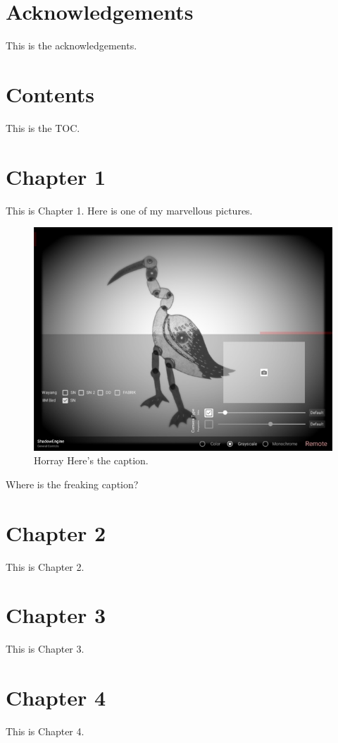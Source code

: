 \hypertarget{acknowledgements}{%
\chapter{Acknowledgements}\label{acknowledgements}}

This is the acknowledgements.

\hypertarget{contents}{%
\chapter{Contents}\label{contents}}

This is the TOC.

\hypertarget{chapter-1}{%
\chapter{Chapter 1}\label{chapter-1}}

This is Chapter 1. Here is one of my marvellous pictures.

\begin{figure}
\centering
\includegraphics{assets/image053.jpg}
\caption{Horray Here's the caption.}
\end{figure}

Where is the freaking caption?

\hypertarget{chapter-2}{%
\chapter{Chapter 2}\label{chapter-2}}

This is Chapter 2.

\hypertarget{chapter-3}{%
\chapter{Chapter 3}\label{chapter-3}}

This is Chapter 3.
\autocite{kozelCloserPerformanceTechnologies2007}

\hypertarget{chapter-4}{%
\chapter{Chapter 4}\label{chapter-4}}

This is Chapter 4.

\autocite{aielloShadowMonstersPhilip2013}

